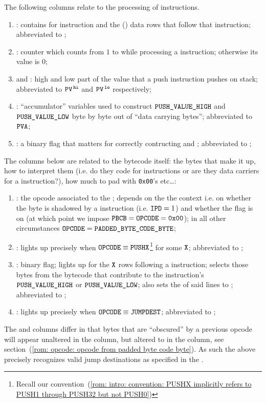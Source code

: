The following columns relate to the processing of  instructions.
\begin{enumerate}[resume]
    \item \PP{}:
	contains  for  instruction and the () data rows that follow that instruction;
	abbreviated to \pp{};
    \item \CP{}:
	counter which counts from $1$ to \PP{} while processing a  instruction;
	otherwise its value is $0$;
    \item \PV\HIGH{} and \PV\LOW{}:
	high and low part of the value that a push instruction pushes on stack;
	abbreviated to $\texttt{PV}^{\mathtt{\,hi}}$ and $\texttt{PV}^{\mathtt{\,lo}}$ respectively;
    \item \PVA:
	``accumulator'' variables used to construct $\texttt{PUSH\_VALUE}\texttt{\_HIGH}$ and $\texttt{PUSH\_VALUE}\texttt{\_LOW}$ byte by byte out of ``data carrying bytes'';
	abbreviated to $\texttt{PVA}$;
    \item \PFB{}:
	a binary flag that matters for correctly contructing \PV\HIGH{} and \PV\LOW{};
	abbreviated to \pfb{};
\end{enumerate}

The columns below are related to the bytecode itself: the bytes that make it up, how to interpret them (i.e. do they code for instructions or are they data carriers for a  instruction?), how much to pad with \texttt{0x00}'s etc\dots:
\begin{enumerate}[resume]
    \item \opc{}:
	the opcode associated to the \pbcb{};
	depends on the the context i.e. on whether the byte is shadowed by a  instruction (i.e. \( \texttt{IPD}{}=1 \)) and whether the \CSR{} flag is on (at which point we impose $\texttt{PBCB}=\texttt{OPCODE}=\texttt{0x00}$);
	in all other circumstances \( \texttt{OPCODE}{} = \texttt{PADDED\_BYTE\_CODE\_BYTE}{} \);
    \item \IP{}:
	lights up precisely when
	$\texttt{OPCODE} \equiv \texttt{PUSHX}$\footnote{Recall our convention~(\ref{rom: intro: convention: PUSHX implicitly refers to PUSH1 through PUSH32 but not PUSH0})}
	for some $\texttt{X}$;
	abbreviated to \ip{};
    \item \IPD{}:
	binary flag;
	lights up for the $\texttt{X}$ rows following a  instruction;
	selects those bytes from the bytecode that contribute to the  instruction's $\texttt{PUSH\_VALUE}\texttt{\_HIGH}$ or $\texttt{PUSH\_VALUE}\texttt{\_LOW}$;
	also sets the \opc{} of said lines to ;
	abbreviated to \ipd{};
    \item \ISVALIDJUMPDESTINATION{}:
	lights up precisely when $\texttt{OPCODE} \equiv \texttt{JUMPDEST}$;
	abbreviated to \isValidJumpDestination{};
\end{enumerate}
\saNote{}
The \opc{} and \pbcb{} columns differ in that bytes that are ``obscured'' by a previous  opcode
will appear unaltered in the \pbcb{} column, but altered to  in the \opc{} column, see section~(\ref{rom: opcode: opcode from padded byte code byte}).
As such the above precisely recognizes valid jump destinations as specified in the \cite{EYP}.

